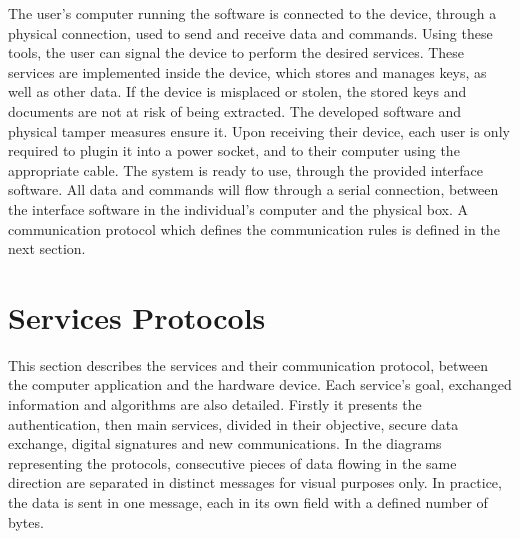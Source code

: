 The user's computer running the software is connected to the device, through a physical connection, used to send and receive data and commands.
Using these tools, the user can signal the device to perform the desired services.
These services are implemented inside the device, which stores and manages keys, as well as other data.
If the device is misplaced or stolen, the stored keys and documents are not at risk of being extracted. The developed software and physical tamper measures ensure it.
Upon receiving their device, each user is only required to plugin it into a power socket, and to their computer using the appropriate cable. The system is ready to use, through the provided interface software.
All data and commands will flow through a serial connection, between the interface software in the individual's computer and the physical box. A communication protocol which defines the communication rules is defined in the next section.

\section{Services Protocols}\label{chap:arch:services}

This section describes the services and their communication protocol, between the computer application and the hardware device. Each service's goal, exchanged information and algorithms are also detailed.
Firstly it presents the authentication, then main services, divided in their objective, secure data exchange, digital signatures and new communications.
In the diagrams representing the protocols, consecutive pieces of data flowing in the same direction are separated in distinct messages for visual purposes only. In practice, the data is sent in one message, each in its own field with a defined number of bytes.


